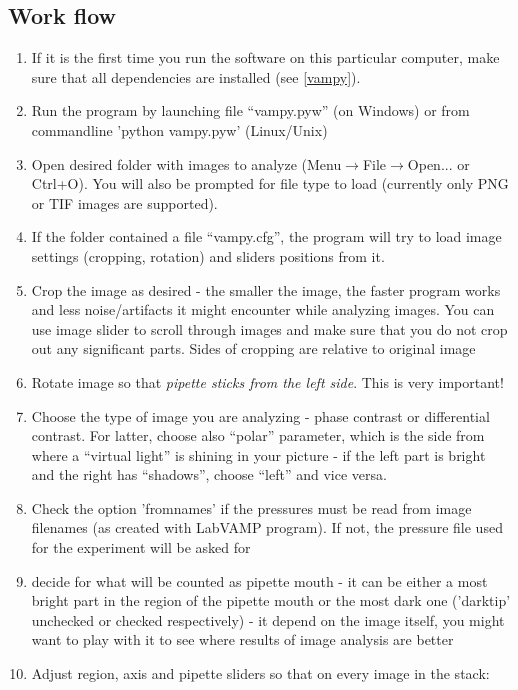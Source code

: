\subsection{Work flow}\label{vampy-work}
\begin{enumerate}
	\item If it is the first time you run the software on this particular computer, make sure that all dependencies are installed (see \ref{vampy}).
	\item Run the program by launching file ``vampy.pyw'' (on Windows) or from commandline 'python vampy.pyw' (Linux/Unix)
	\item Open desired folder with images to analyze (Menu$\rightarrow$File$\rightarrow$Open... or Ctrl+O). You will also be prompted for file type to load (currently only PNG or TIF images are supported).
	\item If the folder contained a file ``vampy.cfg'', the program will try to load image settings (cropping, rotation) and sliders positions from it.
	\item Crop the image as desired - the smaller the image, the faster program works and less noise/artifacts it might encounter while analyzing images. You can use image slider to scroll through images and make sure that you do not crop out any significant parts. Sides of cropping are relative to original image
	\item Rotate image so that \emph{pipette sticks from the left side}. This is very important!
	\item Choose the type of image you are analyzing - phase contrast or differential contrast. For latter, choose also ``polar'' parameter, which is the side from where a ``virtual light'' is shining in your picture - if the left part is bright and the right has ``shadows'', choose ``left'' and vice versa.
	\item Check the option 'fromnames' if the pressures must be read from image filenames (as created with LabVAMP program). If not, the pressure file used for the experiment will be asked for
	\item decide for what will be counted as pipette mouth - it can be either a most bright part in the region of the pipette mouth or the most dark one ('darktip' unchecked or checked respectively) - it depend on the image itself, you might want to play with it to see where results of image analysis are better
	\item Adjust region, axis and pipette sliders so that on every image in the stack:
	\begin{itemize}

\end{itemize}
\end{enumerate}
